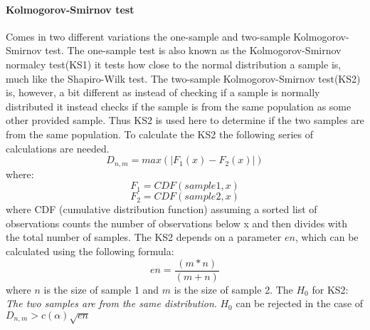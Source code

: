\paragraph{Kolmogorov-Smirnov test}
Comes in two different variations the one-sample and two-sample Kolmogorov-Smirnov test. The one-sample test is also known as the Kolmogorov-Smirnov normalcy test(KS1) it tests how close to the normal distribution a sample is, much like the Shapiro-Wilk test. The two-sample Kolmogorov-Smirnov test(KS2) is, however, a bit different as instead of checking if a sample is normally distributed it instead checks if the sample is from the same population as some other provided sample. Thus KS2 is used here to determine if the two samples are from the same population. To calculate the KS2 the following series of calculations are needed.
$$D_{n,m} = max(|F_1(x)-F_2(x)|)$$
where:
$$F_1 = CDF(sample1,x)$$
$$F_2 = CDF(sample2,x)$$
where CDF (cumulative distribution function) assuming a sorted list of observations counts the number of observations below x and then divides with the total number of samples. The KS2 depends on a parameter $en$, which can be calculated using the following formula:
$$en=\frac{(m*n)}{(m+n)}$$
where $n$ is the size of sample 1 and $m$ is the size of sample 2.
The $H_0$ for KS2: \textit{The two samples are from the same distribution}.
$H_0$ can be rejected in the case of $D_{n,m} > c(\alpha)\sqrt{en}$\cite{massey1951kolmogorov}
